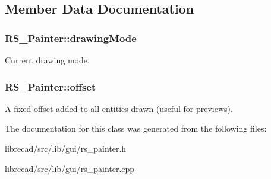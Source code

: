 \subsection{Member Data Documentation}
\hypertarget{classRS__Painter_a8576780585347b0682daffb1b8cf8b1c}{
\subsubsection[{drawing\-Mode}]{ R\-S\-\_\-\-Painter\-::drawing\-Mode\hspace{0.3cm}{\ttfamily [protected]}}}\label{classRS__Painter_a8576780585347b0682daffb1b8cf8b1c}
Current drawing mode. \hypertarget{classRS__Painter_a5d6c68b2780795e155e846cef39cd42b}{
\subsubsection[{offset}]{ R\-S\-\_\-\-Painter\-::offset\hspace{0.3cm}{\ttfamily [protected]}}}\label{classRS__Painter_a5d6c68b2780795e155e846cef39cd42b}
A fixed offset added to all entities drawn (useful for previews). 

The documentation for this class was generated from the following files\-:\begin{DoxyCompactItemize}
\item 
librecad/src/lib/gui/rs\-\_\-painter.\-h\item 
librecad/src/lib/gui/rs\-\_\-painter.\-cpp\end{DoxyCompactItemize}
